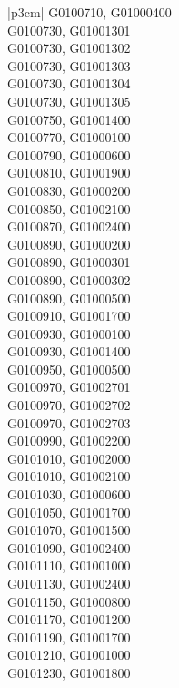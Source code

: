 \begin{customLongTable}{ |p{3cm}| }
G0100710, G01000400 \\ \hline
G0100730, G01001301 \\ \hline
G0100730, G01001302 \\ \hline
G0100730, G01001303 \\ \hline
G0100730, G01001304 \\ \hline
G0100730, G01001305 \\ \hline
G0100750, G01001400 \\ \hline
G0100770, G01000100 \\ \hline
G0100790, G01000600 \\ \hline
G0100810, G01001900 \\ \hline
G0100830, G01000200 \\ \hline
G0100850, G01002100 \\ \hline
G0100870, G01002400 \\ \hline
G0100890, G01000200 \\ \hline
G0100890, G01000301 \\ \hline
G0100890, G01000302 \\ \hline
G0100890, G01000500 \\ \hline
G0100910, G01001700 \\ \hline
G0100930, G01000100 \\ \hline
G0100930, G01001400 \\ \hline
G0100950, G01000500 \\ \hline
G0100970, G01002701 \\ \hline
G0100970, G01002702 \\ \hline
G0100970, G01002703 \\ \hline
G0100990, G01002200 \\ \hline
G0101010, G01002000 \\ \hline
G0101010, G01002100 \\ \hline
G0101030, G01000600 \\ \hline
G0101050, G01001700 \\ \hline
G0101070, G01001500 \\ \hline
G0101090, G01002400 \\ \hline
G0101110, G01001000 \\ \hline
G0101130, G01002400 \\ \hline
G0101150, G01000800 \\ \hline
G0101170, G01001200 \\ \hline
G0101190, G01001700 \\ \hline
G0101210, G01001000 \\ \hline
G0101230, G01001800 \\ \hline

\end{customLongTable}
